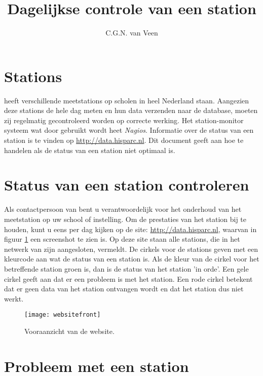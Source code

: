 



\title{Dagelijkse controle van een station} \author{C.G.N. van Veen}
\date{}

\maketitle

\section{Stations}

\hisparc heeft verschillende meetstations op scholen in heel Nederland
staan. Aangezien deze stations de hele dag meten en hun data verzenden
naar de \hisparc database, moeten zij regelmatig gecontroleerd worden op
correcte werking. Het station-monitor systeem wat door \hisparc gebruikt wordt heet \emph{Nagios}. 
Informatie over de status van een station is te vinden op \url{http://data.hisparc.nl}. 
Dit document geeft aan hoe te handelen als de status van een station niet optimaal is.

\section{Status van een station controleren}

Als contactpersoon van \hisparc bent u verantwoordelijk voor het
onderhoud van het meetstation op uw school of instelling. Om de
prestaties van het station bij te houden, kunt u eens per dag kijken op
de site: \url{http://data.hisparc.nl}, waarvan in figuur
\ref{fig:frontweb} een screenshot te zien is. Op deze site staan alle
stations, die in het netwerk van \hisparc zijn aangesloten, vermeldt. De
cirkels voor de stations geven met een kleurcode aan wat de status van
een station is. Als de kleur van de cirkel voor het betreffende station
groen is, dan is de status van het station 'in orde'. Een gele cirkel
geeft aan dat er een probleem is met het station. Een rode cirkel
betekent dat er geen data van het station ontvangen wordt en dat het
station dus niet werkt.

\begin{figure} \centering \texttt{[image: websitefront]}
\caption{Vooraanzicht van de \hisparc website.} \label{fig:frontweb}
\end{figure}

\section{Probleem met een station}

